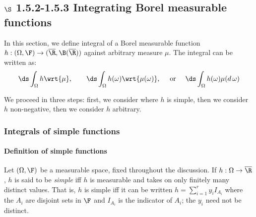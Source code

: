 \documentclass{article} %
\begin{document}

\subsection{$\S$ 1.5.2-1.5.3 Integrating  Borel measurable functions}

In this section, we define integral of a Borel measurable function $h : (\Omega, \F) \to (\overline{\R}, \B(\overline{\R}))$ against arbitrary measure $\mu$.  The integral can be written as:
\begin{align}
 \ds\int_{\Omega} h \wrt{\mu}, \quad \quad \ds\int_{\Omega} h(\omega) \wrt{\mu(\omega)}, \quad \text{ or } \quad \ds\int_{\Omega} h(\omega) \mu(d \, \omega) 
\label{eq:notation_for_Borel_measurable_functions}
\end{align}

 
 We proceed in three steps: first, we consider where $h$ is simple, then we consider $h$ non-negative, then we consider $h$ arbitrary. 



\subsubsection{Integrals of simple functions}

\paragraph{Definition of simple functions} 

\begin{definition}
Let $(\Omega, \F)$ be a measurable space, fixed throughout the discussion.  If $h : \Omega \to \overline{\R}$, $h$ is said to be \textit{simple} iff $h$ is measurable and takes on only finitely many distinct values.  That is, $h$ is simple iff it can be written $h = \sum_{i=1}^r y_i I_{A_i}$ where the $A_i$ are disjoint sets in $\F$ and $I_{A_i}$ is the indicator of $A_i$; the $y_i$ need not be distinct. 
\label{def:simple_function}	
\end{definition}
\end{document}
